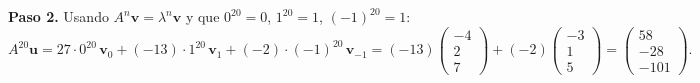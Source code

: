 \begin{prob}
\begin{enumerate}[$a)$]
\begin{myproof}
\textbf{Paso 2.} Usando $A^n\mathbf{v}=\lambda^n\mathbf{v}$ y que $0^{20}=0$, $1^{20}=1$, $(-1)^{20}=1$:
\[
A^{20}\mathbf{u} = 27\cdot 0^{20}\,\mathbf{v}_0 + (-13)\cdot 1^{20}\,\mathbf{v}_1 + (-2)\cdot(-1)^{20}\,\mathbf{v}_{-1}
= (-13)\begin{pmatrix}-4\\2\\7\end{pmatrix} + (-2)\begin{pmatrix}-3\\1\\5\end{pmatrix}
= \boxed{\begin{pmatrix}58\\-28\\-101\end{pmatrix}}.
\]
\end{myproof}
\end{enumerate}
\end{prob}

 


	



